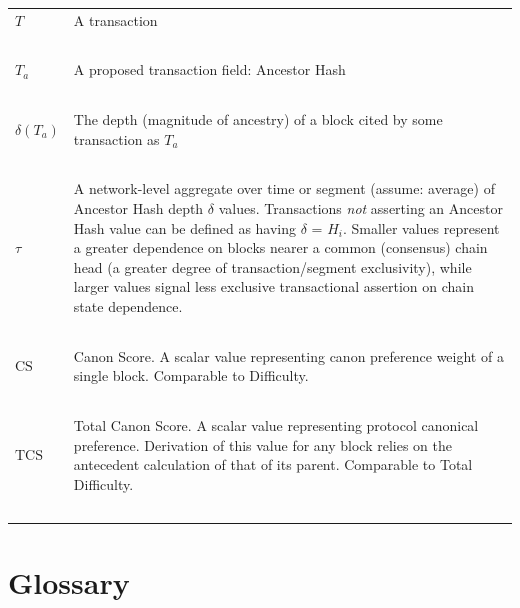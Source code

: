 \documentclass[11pt]{article}
\theoremstyle{plain}
\begin{document}
\begin{table}[H]
{\begin{tabular}{|p{5cm}|p{9cm}|}
$T$ & A transaction \\~\\

$T_a$ & A proposed transaction field: Ancestor Hash \\~\\

$\delta(T_a)$ & The depth (magnitude of ancestry) of a block cited by some
transaction as $T_a$ \\~\\

$\tau$ & A network-level aggregate over time or segment (assume: average) of
Ancestor Hash depth $\delta$ values. Transactions \textit{not} asserting an Ancestor Hash value can be defined as having $\delta$ = $H_i$.
Smaller values represent a greater dependence on blocks nearer a common (consensus) chain head (a greater degree of transaction/segment exclusivity), while larger values signal less exclusive transactional assertion on chain state dependence.
\\~\\

$\mathrm{CS}$ & Canon Score. A scalar value representing canon preference
weight of a single block. Comparable to Difficulty. \\~\\

$\mathrm{TCS}$ & Total Canon Score. A scalar value representing protocol
canonical preference. Derivation of this value for any block relies on the
antecedent calculation of that of its parent. Comparable to Total Difficulty.
\\~\\

\hline
\end{tabular}
}
\end{table}

\section{\normalsize{Glossary}}
\end{document}
